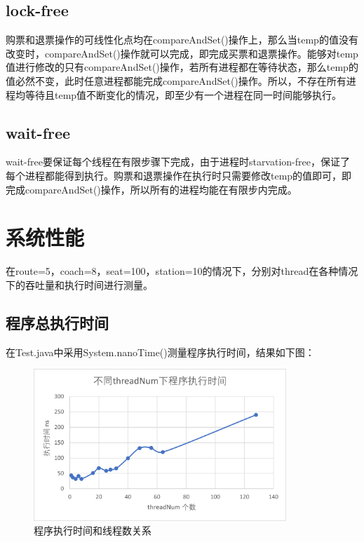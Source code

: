 \documentclass{article}
\begin{document}
\subsection{lock-free}
购票和退票操作的可线性化点均在compareAndSet()操作上，那么当temp的值没有改变时，compareAndSet()操作就可以完成，即完成买票和退票操作。能够对temp值进行修改的只有compareAndSet()操作，若所有进程都在等待状态，那么temp的值必然不变，此时任意进程都能完成compareAndSet()操作。所以，不存在所有进程均等待且temp值不断变化的情况，即至少有一个进程在同一时间能够执行。
\subsection{wait-free}
wait-free要保证每个线程在有限步骤下完成，由于进程时starvation-free，保证了每个进程都能得到执行。购票和退票操作在执行时只需要修改temp的值即可，即完成compareAndSet()操作，所以所有的进程均能在有限步内完成。

\newpage
\section{系统性能}
在route=5，coach=8，seat=100，station=10的情况下，分别对thread在各种情况下的吞吐量和执行时间进行测量。
\subsection{程序总执行时间}
在Test.java中采用System.nanoTime()测量程序执行时间，结果如下图：\par 
\begin{figure}[H]
    \centering
    \includegraphics[width = 0.85\textwidth]{4.png}
    \caption{程序执行时间和线程数关系}
\end{figure}\par
\end{document}
